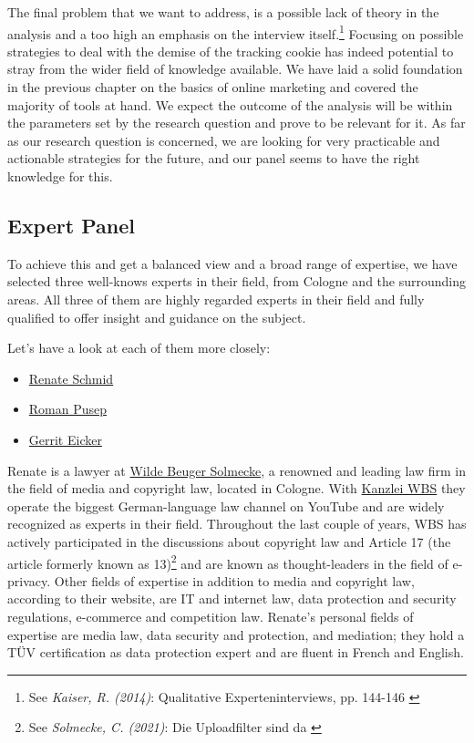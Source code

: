 The final problem that we want to address, is a possible lack of theory in the analysis and a too high an emphasis on the interview itself.\footnote{See \textit{Kaiser, R. (2014)}: Qualitative Experteninterviews, pp. 144-146 \cite{expertInterviews}} Focusing on possible strategies to deal with the demise of the tracking cookie has indeed potential to stray from the wider field of knowledge available. We have laid a solid foundation in the previous chapter on the basics of online marketing and covered the majority of tools at hand. We expect the outcome of the analysis will be within the parameters set by the research question and prove to be relevant for it. As far as our research question is concerned, we are looking for very practicable and actionable strategies for the future, and our panel seems to have the right knowledge for this.

\subsection{Expert Panel}

To achieve this and get a balanced view and a broad range of expertise, we have selected three well-knows experts in their field, from Cologne and the surrounding areas. All three of them are highly regarded experts in their field and fully qualified to offer insight and guidance on the subject.

Let's have a look at each of them more closely:

\begin{itemize}
 \item \href{https://www.linkedin.com/in/renate-schmid-535233113/}{Renate Schmid}
 \item \href{https://www.linkedin.com/in/roman-pusep-36b33374/}{Roman Pusep}
 \item \href{https://www.linkedin.com/in/eicker/}{Gerrit Eicker}
\end{itemize}

Renate is a lawyer at \href{https://www.wbs-law.de/}{Wilde Beuger Solmecke}, a renowned and leading law firm in the field of media and copyright law, located in Cologne. With \href{https://www.youtube.com/user/KanzleiWBS}{Kanzlei WBS} they operate the biggest German-language law channel on YouTube and are widely recognized as experts in their field. Throughout the last couple of years, WBS has actively participated in the discussions about copyright law and Article 17 (the article formerly known as 13)\footnote{See \textit{Solmecke, C. (2021)}: Die Uploadfilter sind da \cite{article17}} and are known as thought-leaders in the field of e-privacy. Other fields of expertise in addition to media and copyright law, according to their website, are IT and internet law, data protection and security regulations, e-commerce and competition law. Renate's personal fields of expertise are media law, data security and protection, and mediation; they hold a TÜV certification as data protection expert and are fluent in French and English.

